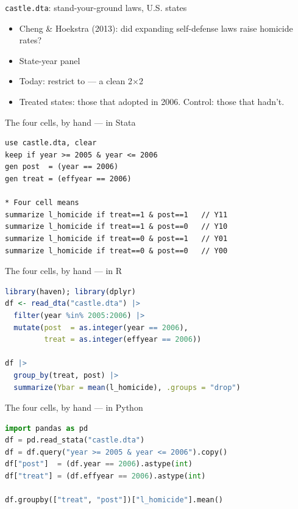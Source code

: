 \documentclass[aspectratio=169,11pt]{beamer}
\begin{document}
\begin{frame}{\texttt{castle.dta}: stand-your-ground laws, U.S. states}
\vspace{0.5em}
\begin{itemize}
  \item Cheng \& Hoekstra (2013): did expanding self-defense laws raise homicide rates?
  \item State-year panel
  \item Today: restrict to  --- a clean 2$\times$2
  \item Treated states: those that adopted in 2006. Control: those that hadn't.
\end{itemize}
\vspace{0.6em}
\end{frame}

\begin{frame}[fragile]{The four cells, by hand --- in Stata}
\vspace{0.3em}
\begin{lstlisting}[language={[ANSI]C}]
use castle.dta, clear
keep if year >= 2005 & year <= 2006
gen post  = (year == 2006)
gen treat = (effyear == 2006)

* Four cell means
summarize l_homicide if treat==1 & post==1   // Y11
summarize l_homicide if treat==1 & post==0   // Y10
summarize l_homicide if treat==0 & post==1   // Y01
summarize l_homicide if treat==0 & post==0   // Y00
\end{lstlisting}
\end{frame}

\begin{frame}[fragile]{The four cells, by hand --- in R}
\vspace{0.3em}
\begin{lstlisting}[language=R]
library(haven); library(dplyr)
df <- read_dta("castle.dta") |>
  filter(year %in% 2005:2006) |>
  mutate(post  = as.integer(year == 2006),
         treat = as.integer(effyear == 2006))

df |>
  group_by(treat, post) |>
  summarize(Ybar = mean(l_homicide), .groups = "drop")
\end{lstlisting}
\end{frame}

\begin{frame}[fragile]{The four cells, by hand --- in Python}
\vspace{0.3em}
\begin{lstlisting}[language=Python]
import pandas as pd
df = pd.read_stata("castle.dta")
df = df.query("year >= 2005 & year <= 2006").copy()
df["post"]  = (df.year == 2006).astype(int)
df["treat"] = (df.effyear == 2006).astype(int)

df.groupby(["treat", "post"])["l_homicide"].mean()
\end{lstlisting}
\end{frame}
\end{document}
